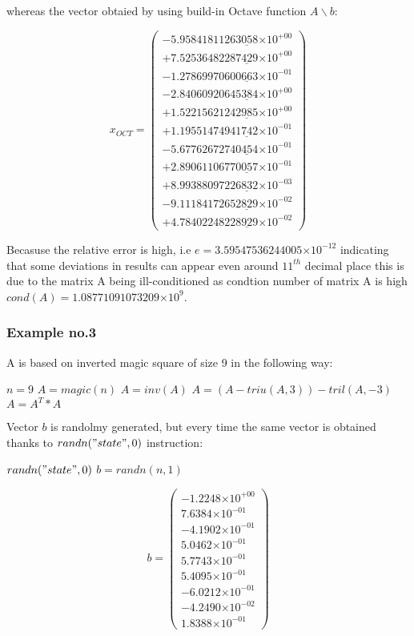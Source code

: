 \documentclass{article}
\providecommand{\e}[1]{\ensuremath{\times 10^{#1}}}
\begin{document}
whereas the vector obtaied by using build-in Octave function $A \backslash b$:

\[ x_{OCT} = \left(
\begin{array}{c}
  -5.9584181126\underline{3058}\e{+00} \\
  +7.5253648228\underline{7429}\e{+00} \\
  -1.2786997060\underline{0663}\e{-01} \\
  -2.8406092064\underline{5384}\e{+00} \\
  +1.5221562124\underline{2985}\e{+00} \\
  +1.1955147494\underline{1742}\e{-01} \\
  -5.6776267274\underline{0454}\e{-01} \\
  +2.8906110677\underline{0057}\e{-01} \\
  +8.9938809722\underline{6832}\e{-03} \\
  -9.1118417265\underline{2829}\e{-02} \\
  +4.7840224822\underline{8929}\e{-02}
\end{array} \right)
\]
   
Becasuse the relative error is high, i.e $e =  3.59547536244005\e{-12}$
indicating that some deviations in results can appear even around $11^{th}$
decimal place this is due to the matrix A being ill-conditioned as condtion
number of matrix A is high $cond(A) = 1.08771091073209\e{9}$.

\subsubsection{Example no.3}

A is based on inverted magic square of size 9 in the following way:

\begin{algorithmic}
\STATE $n=9$
\STATE $A=magic(n)$
\STATE $A=inv(A)$
\STATE $A=(A-triu(A,3))-tril(A,-3)$
\STATE $A=A^T * A$
\end{algorithmic}

Vector $b$ is randolmy generated, but every time the same vector is obtained
thanks to $randn("state", 0)$ instruction:

\begin{algorithmic}
\STATE $randn("state", 0)$
\STATE $b = randn(n, 1)$
\end{algorithmic}

\[ b = \left( \begin{array}{c} 
  -1.2248\e{+00} \\
   7.6384\e{-01} \\
  -4.1902\e{-01} \\
   5.0462\e{-01} \\
   5.7743\e{-01} \\
   5.4095\e{-01} \\
  -6.0212\e{-01} \\
  -4.2490\e{-02} \\
   1.8388\e{-01}
\end{array} \right)
\]
\end{document}
